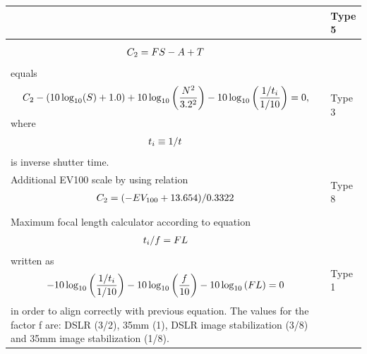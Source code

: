 \documentclass[a4paper,11pt,english]{sphinxmanual}
\begin{document}
\begin{longtable}{|p{14cm}|p{2cm}|}
\begin{gather}
\end{gather} & 
Type 5
\\
\hline\begin{gather}
\begin{split}C_2 = FS-A+T\end{split}\notag
\end{gather}
equals
\begin{gather}
\begin{split}C_2 -(10 \log_{10}(S)+1.0)+10 \log_{10}\left(\frac{N^2}{3.2^2} \right)-10 \log_{10}\left( \frac{1/t_i}{1/10}\right)=0,\end{split}\notag
\end{gather}
where
\begin{gather}
\begin{split}t_i\equiv 1/t\end{split}\notag
\end{gather}
is inverse shutter time.
 & 
Type 3
\\
\hline
Additional EV100 scale by using relation
\begin{gather}
\begin{split}C_2 =(-EV_{100}+13.654)/0.3322\end{split}\notag
\end{gather} & 
Type 8
\\
\hline
Maximum focal length calculator according to equation
\begin{gather}
\begin{split}t_i / f = FL\end{split}\notag
\end{gather}
written as
\begin{gather}
\begin{split}-10 \log_{10}\left( \frac{1/t_i}{1/10}\right) - 10 \log_{10}\left( \frac{f}{10} \right)  -10 \log_{10}\left( FL \right) = 0\end{split}\notag
\end{gather}
in order to align correctly with previous equation.  The values for the factor f  are: DSLR (3/2), 35mm (1),
DSLR image stabilization (3/8) and 35mm image stabilization (1/8).
 & 
Type 1
\\
\hline\end{longtable}
\end{document}
